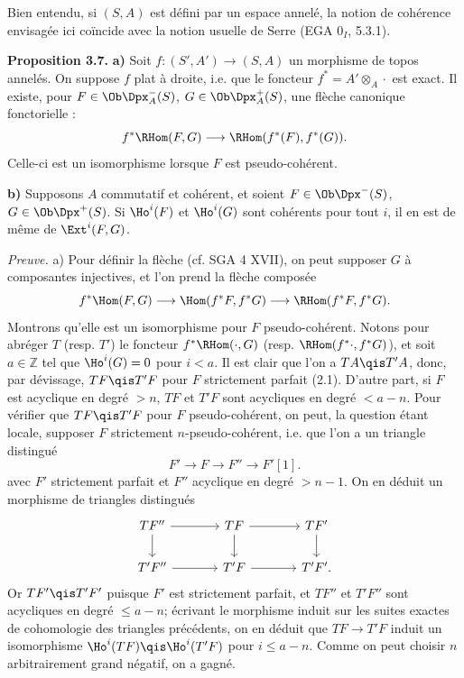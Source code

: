 \documentclass[11pt]{article}
\begin{document}
Bien entendu, si \((S,A)\) est défini par un espace annelé, la notion de cohérence envisagée ici coïncide avec la notion usuelle de Serre (EGA \(0_I\), 5.3.1).

\textbf{Proposition 3.7.} \textbf{a)} Soit \(f:(S',A')\to(S,A)\) un morphisme de topos annelés. On suppose \(f\) plat à droite, i.e. que le foncteur \(f^*=A'\otimes_A\cdot\) est exact. Il existe, pour \(F\in\Ob\Dpx_A^-(S)\), \(G\in\Ob\Dpx_A^+(S)\), une flèche canonique fonctorielle :
\[
  f^*\RHom(F,G)\longrightarrow\RHom(f^*(F),f^*(G)).
\]
Celle-ci est un isomorphisme lorsque \(F\) est pseudo-cohérent.

\textbf{b)} Supposons \(A\) commutatif et cohérent, et soient \(F\in\Ob\Dpx^-(S)\), \(G\in\Ob\Dpx^+(S)\). Si \(\Ho^i(F)\) et \(\Ho^i(G)\) sont cohérents pour tout \(i\), il en est de même de \(\Ext^i(F,G)\).

\emph{Preuve.} a) Pour définir la flèche (cf. SGA 4 XVII), on peut supposer \(G\) à composantes injectives, et l'on prend la flèche composée
\[
  f^*\Hom(F,G)\longrightarrow\Hom(f^*F,f^*G)\longrightarrow\RHom(f^*F,f^*G).
\]
Montrons qu'elle est un isomorphisme pour \(F\) pseudo-cohérent. Notons pour abréger \(T\) (resp. \(T'\)) le foncteur \(f^*\RHom(\cdot,G)\) (resp. \(\RHom(f^*\cdot,f^*G)\)), et soit \(a\in\mathbb Z\) tel que \(\Ho^i(G)=0\) pour \(i<a\). Il est clair que l'on a \(TA\qis T'A\), donc, par dévissage, \(TF\qis T'F\) pour \(F\) strictement parfait (2.1). D'autre part, si \(F\) est acyclique en degré \(>n\), \(TF\) et \(T'F\) sont acycliques en degré \(<a-n\). Pour vérifier que \(TF\qis T'F\) pour \(F\) pseudo-cohérent, on peut, la question étant locale, supposer \(F\) strictement \(n\)-pseudo-cohérent, i.e. que l'on a un triangle distingué
\[
  F'\longrightarrow F\longrightarrow F''\longrightarrow F'[1].
\]
avec \(F'\) strictement parfait et \(F''\) acyclique en degré \(>n-1\). On en déduit un morphisme de triangles distingués
\[
\begin{tikzcd}[column sep=large]
TF'' \arrow[r]\arrow[d]&TF\arrow[r]\arrow[d]&TF'\arrow[d]\\
T'F''\arrow[r]&T'F\arrow[r]&T'F' .
\end{tikzcd}
\]
Or \(TF'\qis T'F'\) puisque \(F'\) est strictement parfait, et \(TF''\) et \(T'F''\) sont acycliques en degré \(\leq a-n\); écrivant le morphisme induit sur les suites exactes de cohomologie des triangles précédents, on en déduit que \(TF\to T'F\) induit un isomorphisme \(\Ho^i(TF)\qis\Ho^i(T'F)\) pour \(i\leq a-n\). Comme on peut choisir \(n\) arbitrairement grand négatif, on a gagné.
\end{document}
